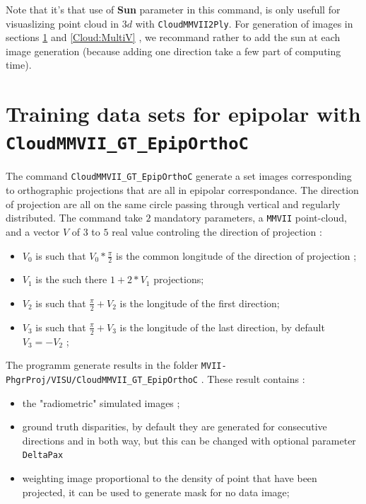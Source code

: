 Note that it's that use of {\bf Sun} parameter in this command, is only usefull for visuaslizing point cloud
in $3d$  with  {\tt CloudMMVII2Ply}.  For generation of images in sections \ref{Cloud:Epip} and  \ref{Cloud:MultiV}
, we recommand rather to add the sun at each image generation (because adding one direction take a few part
of computing time).



\section{Training data sets for epipolar with {\tt CloudMMVII\_GT\_EpipOrthoC}}

\label{Cloud:Epip}


The command  {\tt CloudMMVII\_GT\_EpipOrthoC}  generate a set images corresponding
to orthographic projections that are all in epipolar correspondance. The direction
of projection are all on the same circle passing through vertical and regularly 
distributed. The command take $2$ mandatory parameters,
a {\tt MMVII} point-cloud, and a vector $V$ of $3$ to $5$ real value  controling
the direction of projection :

\begin{itemize}
   \item  $V_0$  is such that $V_0 * \frac{\pi}{2}$ is the common longitude of the direction  of projection ;
   \item   $V_1$ is the such there   $1+2*V_1$ projections;
   \item   $V_2$ is such that  $ \frac{\pi}{2}+V_2$ is the longitude of  the first direction;
   \item   $V_3$ is such that  $ \frac{\pi}{2}+V_3$ is the longitude of  the last direction, by default $V_3 = - V_2$ ;
\end{itemize}


The programm generate  results in the folder {\tt MVII-PhgrProj/VISU/CloudMMVII\_GT\_EpipOrthoC} . These
result contains :

\begin{itemize}
   \item the "radiometric" simulated images ;

   \item  ground truth disparities,  by default they are generated for consecutive directions and
          in both way, but this can be changed with optional parameter {\tt DeltaPax}
   
   \item weighting image proportional to the density of point that have been projected, it can be used
         to generate mask for no data image;

\end{itemize}

